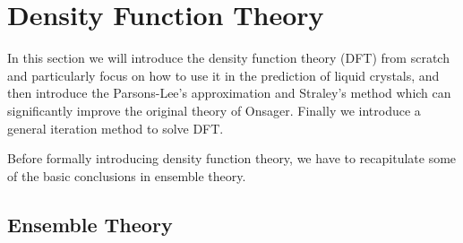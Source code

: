 
\chapter{Density Function Theory}\label{chap:theory}

In this section we will introduce the density function theory (DFT) from scratch and particularly focus on how to use it in the prediction of liquid crystals, and then introduce the Parsons-Lee's approximation and Straley's method which can significantly improve the original theory of Onsager. Finally we introduce a general iteration method to solve DFT.

Before formally introducing density function theory, we have to recapitulate some of the basic conclusions in ensemble theory.

\section{Ensemble Theory}


